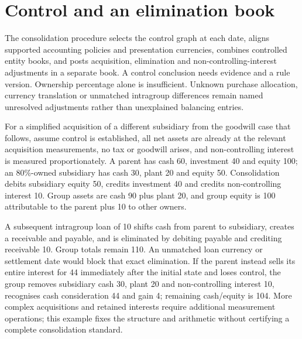 





\section{Control and an elimination book}

The consolidation procedure selects the control graph at each date, aligns
supported accounting policies and presentation currencies, combines controlled
entity books, and posts acquisition, elimination and non-controlling-interest
adjustments in a separate book. A control conclusion needs evidence and a
rule version. Ownership percentage alone is insufficient. Unknown purchase
allocation, currency translation or unmatched intragroup differences remain
named unresolved adjustments rather than unexplained balancing entries.

For a simplified acquisition of a different subsidiary from the goodwill case
that follows, assume control is established, all net assets
are already at the relevant acquisition measurements, no tax or goodwill
arises, and non-controlling interest is measured proportionately. A parent
has cash 60, investment 40 and equity 100; an 80\%-owned subsidiary has cash
30, plant 20 and equity 50. Consolidation debits subsidiary equity 50,
credits investment 40 and credits non-controlling interest 10. Group assets
are cash 90 plus plant 20, and group equity is 100 attributable to the parent
plus 10 to other owners.

A subsequent intragroup loan of 10 shifts cash from parent to subsidiary,
creates a receivable and payable, and is eliminated by debiting payable and
crediting receivable 10. Group totals remain 110. An unmatched loan currency
or settlement date would block that exact elimination. If the parent instead
sells its entire interest for 44 immediately after the initial state and
loses control, the group removes subsidiary cash 30, plant 20 and
non-controlling interest 10, recognises cash consideration 44 and gain 4;
remaining cash/equity is 104. More complex acquisitions and retained interests
require additional measurement operations; this example fixes the structure
and arithmetic without certifying a complete consolidation standard.



